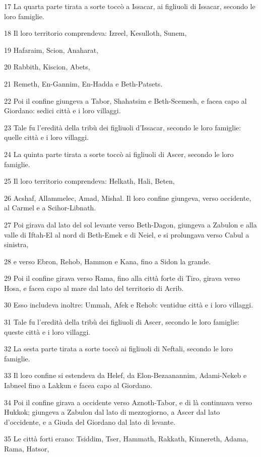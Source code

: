 \par 17 La quarta parte tirata a sorte toccò a Issacar, ai figliuoli di Issacar, secondo le loro famiglie.
\par 18 Il loro territorio comprendeva: Izreel, Kesulloth, Sunem,
\par 19 Hafaraim, Scion, Anaharat,
\par 20 Rabbith, Kiscion, Abets,
\par 21 Remeth, En-Gannim, En-Hadda e Beth-Patsets.
\par 22 Poi il confine giungeva a Tabor, Shahatsim e Beth-Scemesh, e facea capo al Giordano: sedici città e i loro villaggi.
\par 23 Tale fu l'eredità della tribù dei figliuoli d'Issacar, secondo le loro famiglie: quelle città e i loro villaggi.
\par 24 La quinta parte tirata a sorte toccò ai figliuoli di Ascer, secondo le loro famiglie.
\par 25 Il loro territorio comprendeva: Helkath, Hali, Beten,
\par 26 Acshaf, Allammelec, Amad, Mishal. Il loro confine giungeva, verso occidente, al Carmel e a Scihor-Libnath.
\par 27 Poi girava dal lato del sol levante verso Beth-Dagon, giungeva a Zabulon e alla valle di Iftah-El al nord di Beth-Emek e di Neiel, e si prolungava verso Cabul a sinistra,
\par 28 e verso Ebron, Rehob, Hammon e Kana, fino a Sidon la grande.
\par 29 Poi il confine girava verso Rama, fino alla città forte di Tiro, girava verso Hosa, e facea capo al mare dal lato del territorio di Acrib.
\par 30 Esso includeva inoltre: Ummah, Afek e Rehob: ventidue città e i loro villaggi.
\par 31 Tale fu l'eredità della tribù dei figliuoli di Ascer, secondo le loro famiglie: queste città e i loro villaggi.
\par 32 La sesta parte tirata a sorte toccò ai figliuoli di Neftali, secondo le loro famiglie.
\par 33 Il loro confine si estendeva da Helef, da Elon-Bezaanannim, Adami-Nekeb e Iabneel fino a Lakkun e facea capo al Giordano.
\par 34 Poi il confine girava a occidente verso Aznoth-Tabor, e di là continuava verso Hukkok; giungeva a Zabulon dal lato di mezzogiorno, a Ascer dal lato d'occidente, e a Giuda del Giordano dal lato di levante.
\par 35 Le città forti erano: Tsiddim, Tser, Hammath, Rakkath, Kinnereth, Adama, Rama, Hatsor,
